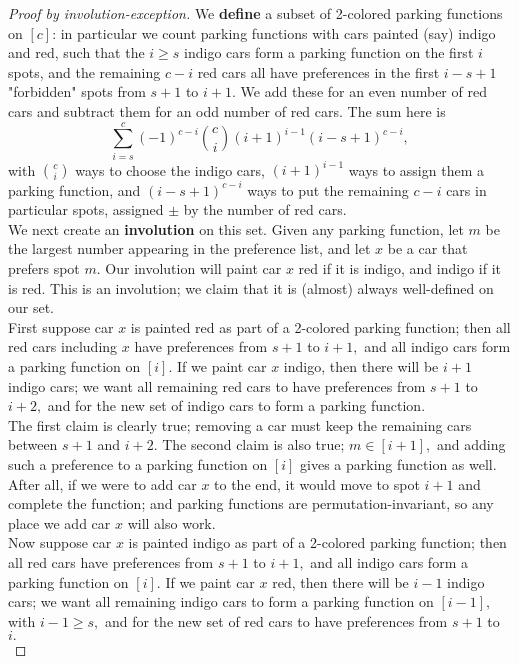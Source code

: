 \begin{proof}[Proof by involution-exception]
    We \textbf{define} a subset of 2-colored parking functions on $[c]$: in particular we count parking functions with cars painted (say) indigo and red, such that the $i\ge s$ indigo cars form a parking function on the first $i$ spots, and the remaining $c-i$ red cars all have preferences in the first $i-s+1$ "forbidden" spots from $s+1$ to $i+1.$ We add these for an even number of red cars and subtract them for an odd number of red cars. The sum here is
	\[
		\sum_{i = s}^{c} (-1)^{c - i} \binom{c}{i} (i + 1)^{i - 1}(i - s + 1)^{c - i},
	\] with $\binom{c}{i}$ ways to choose the indigo cars, $(i+1)^{i-1}$ ways to assign them a parking function, and $(i-s+1)^{c-i}$ ways to put the remaining $c-i$ cars in particular spots, assigned $\pm$ by the number of red cars.\\

    We next create an \textbf{involution} on this set. Given any parking function, let $m$ be the largest number appearing in the preference list, and let $x$ be a car that prefers spot $m.$ Our involution will paint car $x$ red if it is indigo, and indigo if it is red. This is an involution; we claim that it is (almost) always well-defined on our set.\\

    First suppose car $x$ is painted red as part of a 2-colored parking function; then all red cars including $x$ have preferences from $s+1$ to $i+1,$ and all indigo cars form a parking function on $[i].$ If we paint car $x$ indigo, then there will be $i+1$ indigo cars; we want all remaining red cars to have preferences from $s+1$ to $i+2,$ and for the new set of indigo cars to form a parking function.\\

    The first claim is clearly true; removing a car must keep the remaining cars between $s+1$ and $i+2.$ The second claim is also true; $m\in[i+1],$ and adding such a preference to a parking function on $[i]$ gives a parking function as well. After all, if we were to add car $x$ to the end, it would move to spot $i+1$ and complete the function; and parking functions are permutation-invariant, so any place we add car $x$ will also work.\\

    Now suppose car $x$ is painted indigo as part of a 2-colored parking function; then all red cars have preferences from $s+1$ to $i+1,$ and all indigo cars form a parking function on $[i].$ If we paint car $x$ red, then there will be $i-1$ indigo cars; we want all remaining indigo cars to form a parking function on $[i-1],$ with $i-1\ge s,$ and for the new set of red cars to have preferences from $s+1$ to $i.$\\
    

\end{proof}

